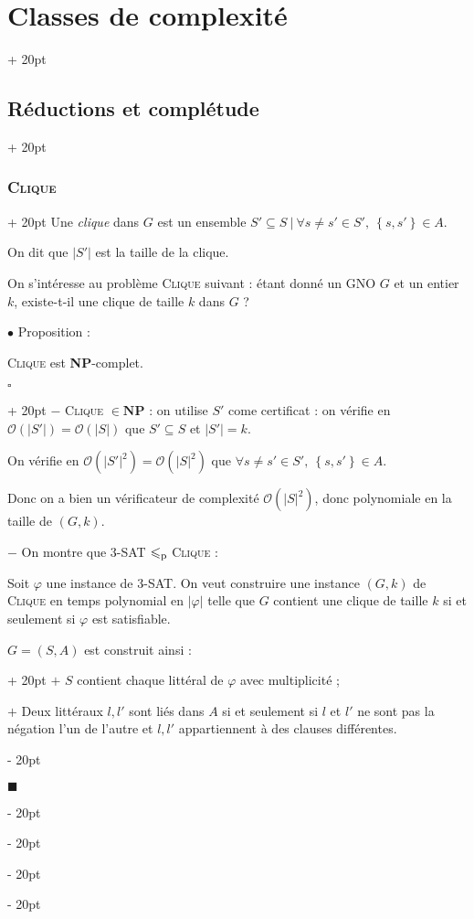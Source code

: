 \documentclass[a4paper, 12pt, twoside]{article}
\newcommand{\lr}[1]{\left( #1 \right)}
\newcommand{\set}[1]{\left\{ #1 \right\}}
\newcommand{\abs}[1]{\left\lvert #1 \right\rvert}
\renewcommand{\le}{\leqslant}
\newcommand{\ind}[1][20pt]{\advance\leftskip + #1}
\newcommand{\deind}[1][20pt]{\advance\leftskip - #1}
\newenvironment{indt}[2][20pt]{#2 \par \ind[#1]}{\par \deind} %
\newenvironment{proof}[1][{}]{\begin{indt}{$\square$ #1}}{$\blacksquare$ \end{indt}}
\begin{document}
\begin{indt}{\section{Classes de complexité}}
\begin{indt}{\subsection{Réductions et complétude}}
\begin{indt}{\subsubsection{\textsc{Clique}}}
                Une \emph{clique} dans $G$ est un ensemble $S' \subseteq S\ |\ \forall s \neq s' \in S',\ \set{s, s'} \in A$.

                On dit que $\abs{S'}$ est la taille de la clique.

                \vspace{6pt}
                
                On s'intéresse au problème \textsc{Clique} suivant : étant donné un GNO $G$ et un entier $k$, existe-t-il une clique de taille $k$ dans $G$ ?

                \vspace{12pt}
                
                $\bullet$ Proposition :
                \begin{emphBox}
                    \textsc{Clique} est \textbf{NP}-complet.
                \end{emphBox}

                \vspace{6pt}
                
                \begin{proof}
                    $-$ \textsc{Clique} $\in \mathbf{NP}$ : on utilise $S'$ come certificat : on vérifie en $\mathcal O(\abs{S'}) = \mathcal O(\abs S)$ que $S' \subseteq S$ et $\abs{S'} = k$.

                    On vérifie en $\mathcal O\!\lr{\abs{S'}^2} = \mathcal O\!\lr{\abs S ^2}$ que $\forall s \neq s' \in S',\ \set{s, s'} \in A$.

                    Donc on a bien un vérificateur de complexité $\mathcal O\!\lr{\abs S ^2}$, donc polynomiale en la taille de $(G, k)$.

                    \vspace{6pt}
                    
                    $-$ On montre que $3$-SAT $\le_{\rm p}$ \textsc{Clique} :

                    Soit $\varphi$ une instance de 3-SAT. On veut construire une instance $(G, k)$ de \textsc{Clique} en temps polynomial en $\abs \varphi$ telle que $G$ contient une clique de taille $k$ si et seulement si $\varphi$ est satisfiable.

                    \begin{indt}{$G = (S, A)$ est construit ainsi :}
                        $+$ $S$ contient chaque littéral de $\varphi$ avec multiplicité ;

                        $+$ Deux littéraux $l, l'$ sont liés dans $A$ si et seulement si $l$ et $l'$ ne sont pas la négation l'un de l'autre et $l, l'$ appartiennent à des clauses différentes.
                    \end{indt}


\end{proof}
\end{indt}
\end{indt}
\end{indt}
\end{document}
